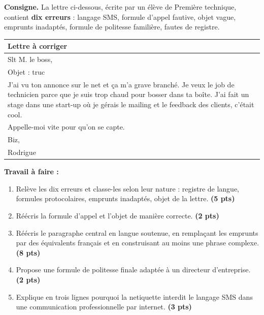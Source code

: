 \documentclass[11pt]{article}
\begin{document}
\begin{exercice}
\textbf{Consigne.} La lettre ci-dessous, écrite par un élève de Première technique, contient \textbf{dix erreurs} : langage SMS, formule d'appel fautive, objet vague, emprunts inadaptés, formule de politesse familière, fautes de registre.

\begin{center}
\begin{tabularx}{\linewidth}{|X|}
\hline
\rowcolor{poppinkL} Lettre à corriger \\
\hline
Slt M. le boss,\\
Objet : truc\\
J'ai vu ton annonce sur le net et ça m'a grave branché. Je veux le job de technicien parce que je suis trop chaud pour bosser dans ta boîte. J'ai fait un stage dans une start-up où je gérais le mailing et le feedback des clients, c'était cool.\\
Appelle-moi vite pour qu'on se capte.\\
Biz,\\
Rodrigue\\
\hline
\end{tabularx}
\end{center}

\textbf{Travail à faire :}
\begin{enumerate}
\item Relève les dix erreurs et classe-les selon leur nature : registre de langue, formules protocolaires, emprunts inadaptés, objet de la lettre. \textbf{(5 pts)}
\item Réécris la formule d'appel et l'objet de manière correcte. \textbf{(2 pts)}
\item Réécris le paragraphe central en langue soutenue, en remplaçant les emprunts par des équivalents français et en construisant au moins une phrase complexe. \textbf{(8 pts)}
\item Propose une formule de politesse finale adaptée à un directeur d'entreprise. \textbf{(2 pts)}
\item Explique en trois lignes pourquoi la netiquette interdit le langage SMS dans une communication professionnelle par internet. \textbf{(3 pts)}
\end{enumerate}
\end{exercice}
\end{document}
